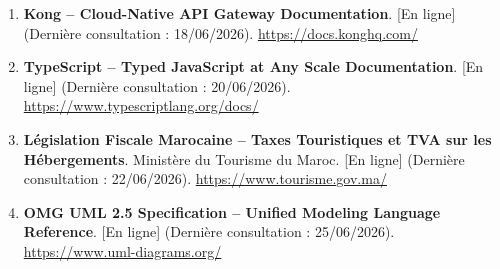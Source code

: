 \begin{enumerate}
    \item \textbf{Kong -- Cloud-Native API Gateway Documentation}. [En ligne] (Dernière consultation : 18/06/2026). \url{https://docs.konghq.com/}
    \item \textbf{TypeScript -- Typed JavaScript at Any Scale Documentation}. [En ligne] (Dernière consultation : 20/06/2026). \url{https://www.typescriptlang.org/docs/}
    \item \textbf{Législation Fiscale Marocaine -- Taxes Touristiques et TVA sur les Hébergements}. Ministère du Tourisme du Maroc. [En ligne] (Dernière consultation : 22/06/2026). \url{https://www.tourisme.gov.ma/}
    \item \textbf{OMG UML 2.5 Specification -- Unified Modeling Language Reference}. [En ligne] (Dernière consultation : 25/06/2026). \url{https://www.uml-diagrams.org/}
\end{enumerate}

\clearpage


